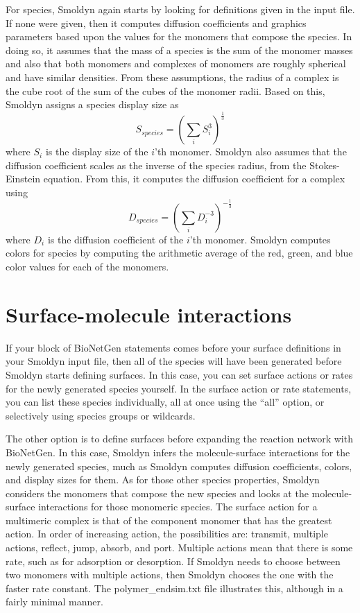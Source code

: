 \documentclass {scrbook}
\begin{document}
For species, Smoldyn again starts by looking for definitions given in the input file. If none were given, then it computes diffusion coefficients and graphics parameters based upon the values for the monomers that compose the species. In doing so, it assumes that the mass of a species is the sum of the monomer masses and also that both monomers and complexes of monomers are roughly spherical and have similar densities. From these assumptions, the radius of a complex is the cube root of the sum of the cubes of the monomer radii. Based on this, Smoldyn assigns a species display size as
$$S_{species} = \left( \sum_i S_i^3 \right)^{\frac{1}{3}}$$
where $S_i$ is the display size of the $i$'th monomer. Smoldyn also assumes that the diffusion coefficient scales as the inverse of the species radius, from the Stokes-Einstein equation. From this, it computes the diffusion coefficient for a complex using
$$D_{species} = \left( \sum_i D_i^{-3} \right)^{-\frac{1}{3}}$$
where $D_i$ is the diffusion coefficient of the $i$'th monomer. Smoldyn computes colors for species by computing the arithmetic average of the red, green, and blue color values for each of the monomers.

\section{Surface-molecule interactions}

If your block of BioNetGen statements comes before your surface definitions in your Smoldyn input file, then all of the species will have been generated before Smoldyn starts defining surfaces. In this case, you can set surface actions or rates for the newly generated species yourself. In the surface action or rate statements, you can list these species individually, all at once using the ``all'' option, or selectively using species groups or wildcards.

The other option is to define surfaces before expanding the reaction network with BioNetGen. In this case, Smoldyn infers the molecule-surface interactions for the newly generated species, much as Smoldyn computes diffusion coefficients, colors, and display sizes for them. As for those other species properties, Smoldyn considers the monomers that compose the new species and looks at the molecule-surface interactions for those monomeric species. The surface action for a multimeric complex is that of the component monomer that has the greatest action. In order of increasing action, the possibilities are: transmit, multiple actions, reflect, jump, absorb, and port. Multiple actions mean that there is some rate, such as for adsorption or desorption. If Smoldyn needs to choose between two monomers with multiple actions, then Smoldyn chooses the one with the faster rate constant. The polymer\_endsim.txt file illustrates this, although in a fairly minimal manner.
\end{document}
